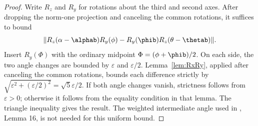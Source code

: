 \begin{proof}
\leanok
Write $R_z$ and $R_y$ for rotations about the third and second axes.
After dropping the norm-one projection and canceling the common rotations,
it suffices to bound
\[
  \|R_z(\alpha-\alphab)R_y(\phi)
       -R_y(\phib)R_z(\theta-\thetab)\|.
\]
Insert $R_y(\Phi)$ with the ordinary midpoint $\Phi=(\phi+\phib)/2$.
On each side, the two angle changes are bounded by $\varepsilon$ and
$\varepsilon/2$. Lemma~\ref{lem:RxRy}, applied after canceling the common
rotations, bounds each difference strictly by
$\sqrt{\varepsilon^2+(\varepsilon/2)^2}=\sqrt{5}\varepsilon/2$.
If both angle changes vanish, strictness follows from $\varepsilon>0$;
otherwise it follows from the equality condition in that lemma.
The triangle inequality gives the result. The weighted intermediate angle
used in \cite{polyhedron.without.rupert}, Lemma 16, is not needed for this
uniform bound.
\end{proof}
